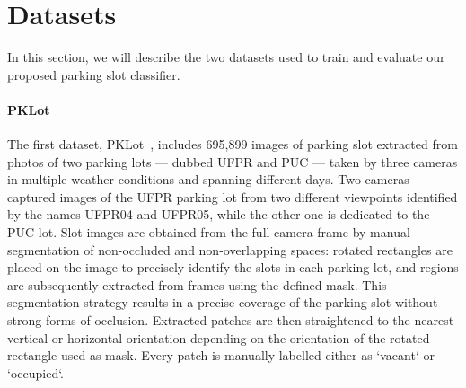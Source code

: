 \section{Datasets}
\label{sec:mini:datasets}

In this section, we will describe the two datasets used to train and evaluate our proposed parking slot classifier.

\paragraph{PKLot}
The first dataset, PKLot~\cite{de2015pklot}, includes 695,899 images of parking slot extracted from photos of two parking lots --- dubbed UFPR and PUC --- taken by three cameras in multiple weather conditions and spanning different days.
Two cameras captured images of the UFPR parking lot from two different viewpoints identified by the names UFPR04 and UFPR05, while the other one is dedicated to the PUC lot.
Slot images are obtained from the full camera frame by manual segmentation of non-occluded and non-overlapping spaces: rotated rectangles are placed on the image to precisely identify the slots in each parking lot, and regions are subsequently extracted from frames using the defined mask.
This segmentation strategy results in a precise coverage of the parking slot without strong forms of occlusion.
Extracted patches are then straightened to the nearest vertical or horizontal orientation depending on the orientation of the rotated rectangle used as mask.
Every patch is manually labelled either as `vacant` or `occupied`.

